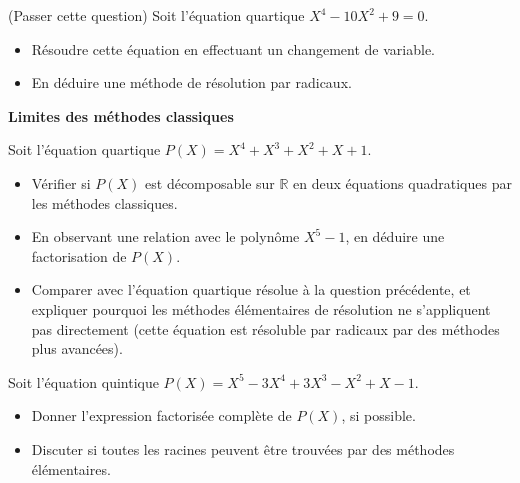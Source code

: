\documentclass[10pt,a4paper]{article}
\begin{document}
\q (Passer cette question) Soit l'équation quartique $ X^4 - 10X^2 + 9 = 0 $.
\begin{itemize}
    \item Résoudre cette équation en effectuant un changement de variable.
    \item En déduire une méthode de résolution par radicaux.
\end{itemize}

\bigskip
\textbf{Limites des méthodes classiques}

\q Soit l'équation quartique \( P(X) = X^4 + X^3 + X^2 + X + 1 \).
\begin{itemize}
    \item Vérifier si \( P(X) \) est décomposable sur \( \mathbb{R} \) en deux équations
    quadratiques par les méthodes classiques.
    \item En observant une relation avec le polynôme $X^5 - 1$, en déduire une factorisation de
    $P(X)$.
    \item Comparer avec l'équation quartique résolue à la question précédente, et expliquer
    pourquoi les méthodes élémentaires de résolution ne s'appliquent pas directement (cette
    équation est résoluble par radicaux par des méthodes plus avancées).
\end{itemize}

\q Soit l'équation quintique $ P(X) = X^5 - 3X^4 + 3X^3 - X^2 + X - 1 $.
\begin{itemize}
    \item Donner l'expression factorisée complète de $ P(X) $, si possible.
    \item Discuter si toutes les racines peuvent être trouvées par des méthodes élémentaires.
\end{itemize}
\end{document}
